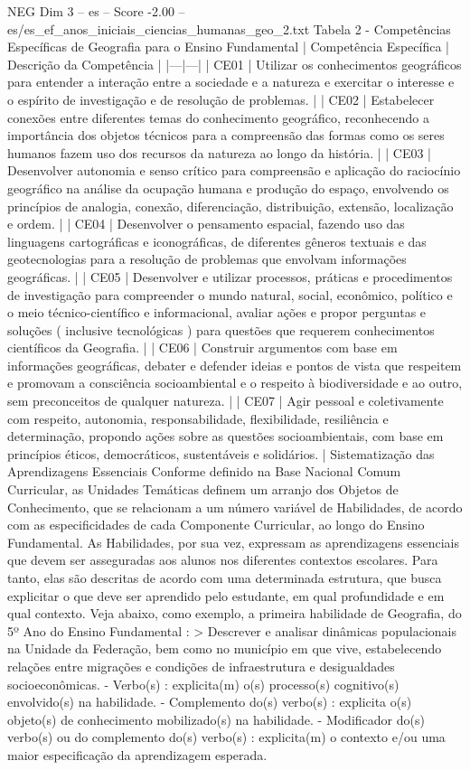\begin{textsample}{NEG Dim 3 – es – Score -2.00 – es/es\_ef\_anos\_iniciais\_ciencias\_humanas\_geo\_2.txt}
Tabela 2 - Competências Específicas de Geografia para o Ensino Fundamental | Competência Específica | Descrição da Competência | |---|---| | CE01 | Utilizar os conhecimentos geográficos para entender a interação entre a sociedade e a natureza e exercitar o interesse e o espírito de investigação e de resolução de problemas. | | CE02 | Estabelecer conexões entre diferentes temas do conhecimento geográfico, reconhecendo a importância dos objetos técnicos para a compreensão das formas como os seres humanos fazem uso dos recursos da natureza ao longo da história. | | CE03 | Desenvolver autonomia e senso crítico para compreensão e aplicação do raciocínio geográfico na análise da ocupação humana e produção do espaço, envolvendo os princípios de analogia, conexão, diferenciação, distribuição, extensão, localização e ordem. | | CE04 | Desenvolver o pensamento espacial, fazendo uso das linguagens cartográficas e iconográficas, de diferentes gêneros textuais e das geotecnologias para a resolução de problemas que envolvam informações geográficas. | | CE05 | Desenvolver e utilizar processos, práticas e procedimentos de investigação para compreender o mundo natural, social, econômico, político e o meio técnico-científico e informacional, avaliar ações e propor perguntas e soluções ( inclusive tecnológicas ) para questões que requerem conhecimentos científicos da Geografia. | | CE06 | Construir argumentos com base em informações geográficas, debater e defender ideias e pontos de vista que respeitem e promovam a consciência socioambiental e o respeito à biodiversidade e ao outro, sem preconceitos de qualquer natureza. | | CE07 | Agir pessoal e coletivamente com respeito, autonomia, responsabilidade, flexibilidade, resiliência e determinação, propondo ações sobre as questões socioambientais, com base em princípios éticos, democráticos, sustentáveis e solidários. | Sistematização das Aprendizagens Essenciais Conforme definido na Base Nacional Comum Curricular, as Unidades Temáticas definem um arranjo dos Objetos de Conhecimento, que se relacionam a um número variável de Habilidades, de acordo com as especificidades de cada Componente Curricular, ao longo do Ensino Fundamental.
As Habilidades, por sua vez, expressam as aprendizagens essenciais que devem ser asseguradas aos alunos nos diferentes contextos escolares.
Para tanto, elas são descritas de acordo com uma determinada estrutura, que busca explicitar o que deve ser aprendido pelo estudante, em qual profundidade e em qual contexto.
Veja abaixo, como exemplo, a primeira habilidade de Geografia, do 5º Ano do Ensino Fundamental : > Descrever e analisar dinâmicas populacionais na Unidade da Federação, bem como no município em que vive, estabelecendo relações entre migrações e condições de infraestrutura e desigualdades socioeconômicas. - Verbo(s) : explicita(m) o(s) processo(s) cognitivo(s) envolvido(s) na habilidade. - Complemento do(s) verbo(s) : explicita o(s) objeto(s) de conhecimento mobilizado(s) na habilidade. - Modificador do(s) verbo(s) ou do complemento do(s) verbo(s) : explicita(m) o contexto e/ou uma maior especificação da aprendizagem esperada.

\end{textsample}
